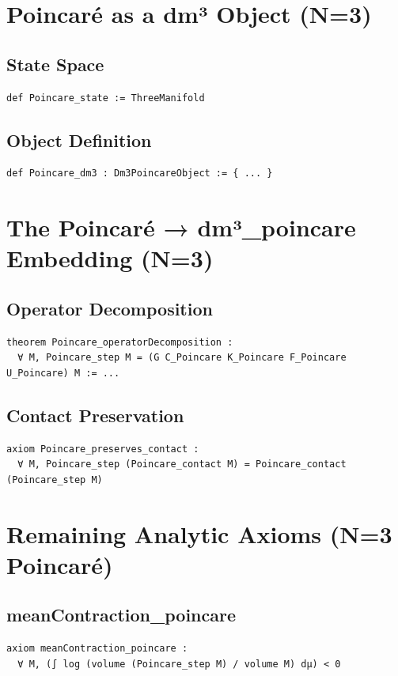 \documentclass[11pt,a4paper]{article}
\begin{document}
\section{Poincaré as a dm³ Object (N=3)}

\subsection{State Space}
\begin{lstlisting}
def Poincare_state := ThreeManifold
\end{lstlisting}

\subsection{Object Definition}
\begin{lstlisting}
def Poincare_dm3 : Dm3PoincareObject := { ... }
\end{lstlisting}

\section{The Poincaré → dm³\_poincare Embedding (N=3)}

\subsection{Operator Decomposition}
\begin{lstlisting}
theorem Poincare_operatorDecomposition :
  ∀ M, Poincare_step M = (G C_Poincare K_Poincare F_Poincare U_Poincare) M := ...
\end{lstlisting}

\subsection{Contact Preservation}
\begin{lstlisting}
axiom Poincare_preserves_contact :
  ∀ M, Poincare_step (Poincare_contact M) = Poincare_contact (Poincare_step M)
\end{lstlisting}

\section{Remaining Analytic Axioms (N=3 Poincaré)}

\subsection{meanContraction\_poincare}
\begin{lstlisting}
axiom meanContraction_poincare :
  ∀ M, (∫ log (volume (Poincare_step M) / volume M) dμ) < 0
\end{lstlisting}
\end{document}
